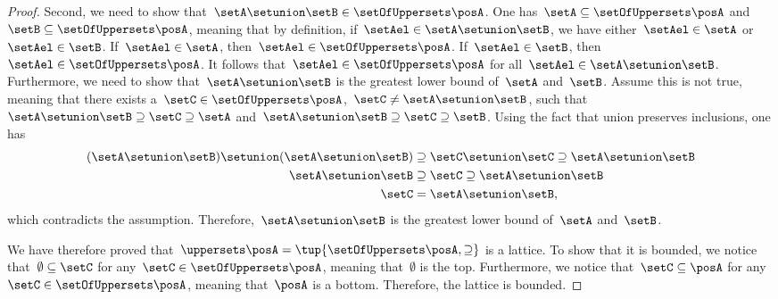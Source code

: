 \begin{proof}
    Second, we need to show that~$\setA\setunion \setB\in \setOfUppersets \posA$.
    One has~$\setA\subseteq \setOfUppersets \posA$ and~$\setB \subseteq \setOfUppersets \posA$, meaning that by definition, if~$\setAel\in \setA\setunion \setB$, we have either~$\setAel\in \setA$ or~$\setAel\in \setB$.
    If~$\setAel\in \setA$, then~$\setAel\in \setOfUppersets \posA$.
    If~$\setAel\in \setB$, then~$\setAel \in \setOfUppersets \posA$.
    It follows that~$\setAel \in \setOfUppersets \posA$ for all~$\setAel\in \setA\setunion \setB$.
    Furthermore, we need to show that~$\setA\setunion \setB$ is the greatest lower bound of~$\setA$ and~$\setB$.
    Assume this is not true, meaning that there exists a~$\setC\in \setOfUppersets \posA$,~$\setC\neq \setA\setunion \setB$, such that~$\setA\setunion \setB\supseteq \setC\supseteq \setA$ and~$\setA\setunion \setB\supseteq \setC\supseteq \setB$.
    Using the fact that union preserves inclusions, one has
    \begin{equation}
        \begin{aligned}
            (\setA\setunion \setB)
            \setunion (\setA\setunion \setB) & \supseteq \setC \setunion \setC \supseteq \setA\setunion \setB \\
            \setA\setunion \setB             & \supseteq \setC\supseteq \setA\setunion \setB                  \\
            \setC                            & =\setA\setunion \setB,
        \end{aligned}
    \end{equation}
    which contradicts the assumption.
    Therefore,~$\setA\setunion \setB$ is the greatest lower bound of~$\setA$ and~$\setB$.

    We have therefore proved that~$\uppersets \posA=\tup{\setOfUppersets \posA,\supseteq}$ is a lattice.
    To show that it is bounded, we notice that~$\emptyset \subseteq \setC$ for any~$\setC\in \setOfUppersets \posA$, meaning that~$\emptyset$ is the top.
    Furthermore, we notice that~$\setC\subseteq \posA$ for any~$\setC\in \setOfUppersets \posA$, meaning that~$\posA$ is a bottom.
    Therefore, the lattice is bounded.
\end{proof}

